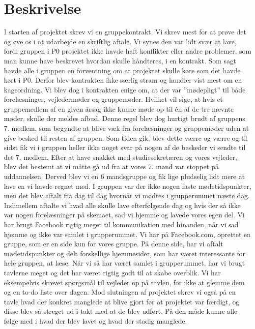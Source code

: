 \section{Beskrivelse}
I starten af projektet skrev vi en gruppekontrakt. Vi skrev mest for at prøve det og øve os i at udarbejde en skriftlig aftale. Vi synes den var lidt svær at lave, fordi gruppen i P0 projektet ikke havde haft konflikter eller andre problemer, som man kunne have beskrevet hvordan skulle håndteres, i en kontrakt. Som sagt havde alle i gruppen en forventning om at projektet skulle køre som det havde kørt i P0. Derfor blev kontrakten ikke særlig stram og handler vist mest om en kageordning. Vi blev dog i kontrakten enige om, at der var ”mødepligt” til både forelæsninger, vejledermøder og gruppemøder. Hvilket vil sige, at hvis et gruppemedlem af en given årsag ikke kunne møde op til én af de tre nævnte møder, skulle der meldes afbud. Denne regel blev dog hurtigt brudt af gruppens 7. medlem, som begyndte at blive væk fra forelæsninger og gruppemøder uden at give besked til resten af gruppen. Som tiden gik, blev dette værre og værre og til sidst fik vi i gruppen heller ikke noget svar på nogen af de beskeder vi sendte til det 7. medlem. Efter at have snakket med studiesekretæren og vores vejleder, blev det bestemt at vi måtte gå ud fra at vores 7. mand var stoppet på uddannelsen. Derved blev vi en 6 mandsgruppe og fik lige pludselig lidt mere at lave en vi havde regnet med.
I gruppen var der ikke nogen faste mødetidspunkter, men det blev aftalt fra dag til dag hvornår vi mødtes i grupperummet næste dag. Indimellem aftalte vi hvad alle skulle lave efterfølgende dag og hvis der så ikke var nogen forelæsninger på skemaet, sad vi hjemme og lavede vores egen del. 
Vi har brugt Facebook rigtig meget til kommunikation med hinanden, når vi sad hjemme og ikke var samlet i grupperummet. Vi har på Facebook.com, oprettet en gruppe, som er en side kun for vores gruppe. På denne side, har vi aftalt mødetidspunkter og delt forskellige hjemmesider, som har været interessante for hele gruppen, at læse. Når vi så har været samlet i grupperummet, har vi brugt tavlerne meget og det har været rigtig godt til at skabe overblik. Vi har eksempelvis skrevet spørgsmål til vejleder op på tavlen, for ikke at glemme dem og en to-do liste over dagen. Mod slutningen af projektet skrev vi også på en tavle hvad der konkret manglede at blive gjort før at projektet var færdigt, og disse blev så streget ud i takt med at de blev udført. På den måde kunne alle følge med i hvad der blev lavet og hvad der stadig manglede. 

